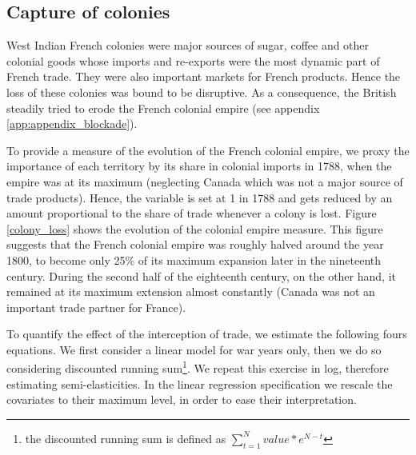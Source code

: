 \documentclass[12pt,a4paper,notitlepage,english]{article}
\begin{document}
\subsection{Capture of colonies}
West Indian French colonies were major sources of sugar, coffee and other colonial goods whose imports and re-exports were the most dynamic part of French trade.
They were also important markets for French products.
Hence the loss of these colonies was bound to be disruptive. 
As a consequence, the British steadily tried to erode the French colonial empire (see appendix \ref{app:appendix_blockade}).


To provide a measure of the evolution of the French colonial empire, we proxy the importance of each territory by its share in colonial imports in 1788, when the empire was at its maximum (neglecting Canada which was not a major source of trade products).
Hence, the variable is set at 1 in 1788 and gets reduced by an amount proportional to the share of trade whenever a colony is lost. 
Figure \ref{colony_loss} shows the evolution of the colonial empire measure.
This figure suggests that the French colonial empire was roughly halved around the year 1800, to become only 25\% of its maximum expansion later in the nineteenth century.
During the second half of the eighteenth century, on the other hand, it remained at its maximum extension almost constantly (Canada was not an important trade partner for France).


To quantify the effect of the interception of trade, we estimate the following fours equations.
We first consider a linear model for war years only, then we do so considering discounted running sum\footnote{the discounted running sum is defined as $\sum_{t=1}^N value*e^{N-t}$}. We repeat this exercise in log, therefore estimating semi-elasticities. 
In the linear regression specification we rescale the covariates to their maximum level, in order to ease their interpretation. 

\end{document}
